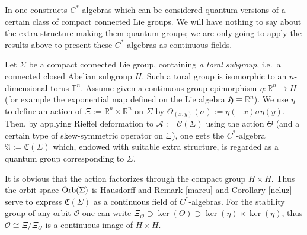 \documentclass[pdftex]{sigma}
\def\A{{\mathcal A}}
\def\Th{\Theta}
\def\AA{\mathfrak A}
\def\C{\mathcal{C}}
\def\CC{{\mathfrak C}}
\def\si{\sigma}
\def\Si{\Sigma}
\providecommand{\CC}{\mathfrak{C}}
\begin{document}
\begin{Example}\label{tertu}
In \cite{Rie3} one constructs $C^*$-algebras which can be considered quantum versions of a certain class of compact
connected Lie groups. We will have nothing to say about the extra structure making them quantum groups; we are only going to
apply the results above to present these $C^*$-algebras as continuous f\/ields.

Let $\Si$ be a compact connected Lie group, containing {\it a toral subgroup}, i.e.\ a connected closed Abelian subgroup $H$.
Such a toral group is isomorphic to an $n$-dimensional torus $\mathbb T^n$. Assume given a continuous group epimorphism
$\eta:\mathbb R^n\rightarrow H$ (for example the exponential map def\/ined on the Lie algebra $\mathfrak H\equiv\mathbb R^n$).
We use $\eta$ to def\/ine an action of $\Xi:=\mathbb R^n\times\mathbb R^n$ on $\Si$ by $\Th_{(x,y)}(\si):=\eta(-x)\si\eta(y)$.
Then, by applying Rief\/fel deformation to $\A:=\C(\Si)$ using the action $\Th$ (and a certain type of skew-symmetric
operator on $\Xi$), one gets the $C^*$-algebra $\AA:=\CC(\Si)$ which, endowed with suitable extra structure, is
regarded as a quantum group corresponding to $\Si$.

It is obvious that the action factorizes through the compact group $H\times H$.
Thus the orbit space ${\rm Orb}(\Si)$ is Hausdorf\/f and
Remark \ref{marcu} and Corollary \ref{neluz} serve to express $\CC(\Si)$ as a continuous f\/ield of $C^*$-algebras.
For the stability group of any orbit $\mathcal O$ one can write
$\Xi_\mathcal O\supset\ker(\Th)\supset \ker(\eta)\times\ker(\eta)$,
thus $\mathcal O\cong\Xi/\Xi_\mathcal O$ is a continuous image of $H\times H$.
\end{Example}
\end{document}
